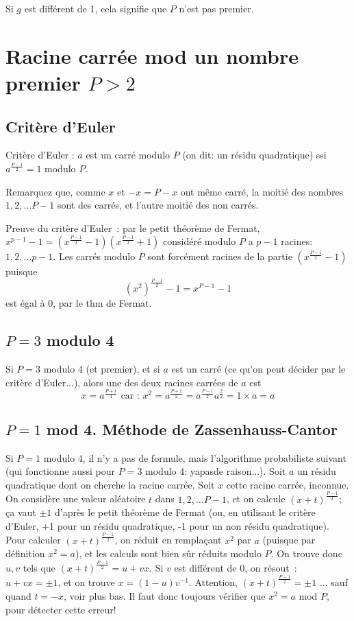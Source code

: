 \documentclass[a4paper]{article}
\begin{document}
Si $g$ est diff\'erent de 1, cela signifie que $P$ n'est pas premier.

\section{Racine carr\'ee mod un nombre premier $P > 2$}

\subsection{Crit\`ere d'Euler}

Crit\`ere d'Euler : $a$ est un carr\'e modulo $P$ (on dit: un r\'esidu quadratique) ssi $a^{\frac{P-1}{2}}= 1$ modulo $P$.

Remarquez que, comme $x$ et $-x=P-x$  ont m\^eme carr\'e, la moiti\'e des
nombres $1, 2,\ldots P-1$ sont des carr\'es, et l'autre moiti\'e des non carr\'es. 

Preuve du crit\`ere d'Euler~: par le petit th\'eor\`eme de Fermat, 
$x^{p-1}-1 = (x^{\frac{P-1}{2}}-1) (x^{\frac{P-1}{2}}+1)$ consid\'er\'e modulo $P$  a 
$p-1$ racines: $1, 2, \ldots p-1$. Les carr\'es modulo $P$ sont forc\'ement racines de la 
partie $(x^{\frac{P-1}{2}}-1)$ puisque 
$$(x^2)^{\frac{P-1}{2}}- 1= x^{P-1}- 1$$ est \'egal \`a 0, par le thm de Fermat.

\subsection{$P= 3$ modulo 4}
Si $P= 3$ modulo 4 (et premier), et si $a$ est un carr\'e (ce qu'on peut d\'ecider par le crit\`ere d'Euler...),
alors une des deux racines carr\'ees de $a$ est 
$$x=a^{\frac{P+1}{4}}\mbox{ car : } x^2= a^{\frac{P+1}{2}}=a^{\frac{P-1}{2}}a^{\frac{2}{2}}=1 \times a= a$$


\subsection{ $P=1$ mod 4. M\'ethode de Zassenhauss-Cantor}

Si $P=1$ modulo 4, il n'y a pas de formule, mais l'algorithme probabiliste suivant (qui fonctionne aussi pour $P=3$ modulo 4: yapasde raison...). Soit $a$ un r\'esidu quadratique dont on cherche la racine carr\'ee. Soit $x$ cette racine carr\'ee, inconnue. On consid\`ere une valeur al\'eatoire $t$
dans $1, 2, \ldots P-1$, et on calcule $(x+t)^{\frac{P-1}{2}}$; \c{c}a vaut $\pm 1$ d'apr\`es le petit th\'eor\`eme de Fermat (ou, en utilisant le crit\`ere d'Euler, +1 pour un r\'esidu quadratique, -1 pour un non r\'esidu quadratique). Pour calculer $(x+t)^{\frac{P-1}{2}}$, on r\'eduit en
rempla\c{c}ant $x^2$ par $a$ (puisque par d\'efinition $x^2=a$), et les calculs sont bien s\^ur r\'eduits modulo $P$. On trouve donc $u, v$ tels que $(x+t)^{\frac{P-1}{2}}=u+vx$. Si $v$ est diff\'erent de 0, on r\'esout~: $u+vx=\pm 1$, et on trouve $x=(1-u)v^{-1}$. 
Attention, $(x+t)^{\frac{P-1}{2}}=\pm 1$ ... sauf quand $t=-x$, voir plus bas. Il faut donc toujours v\'erifier que $x^2=a$ mod $P$, pour d\'etecter cette erreur!
\end{document}

